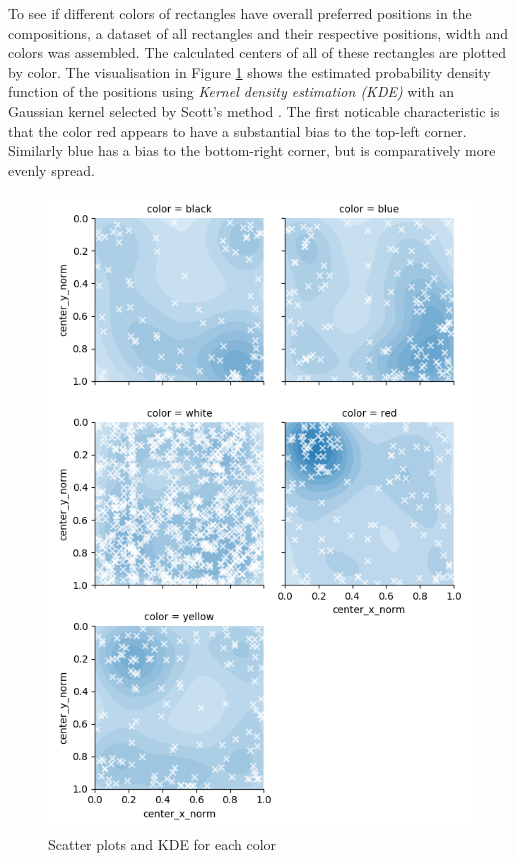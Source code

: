 \documentclass[serif,article,noparskip]{agse-thesis}
\begin{document}
To see if different colors of rectangles have overall preferred positions in the
compositions, a dataset of all rectangles and their respective positions, width
and colors was assembled. The calculated centers of all of these rectangles are
plotted by color. The visualisation in Figure \ref{fig:kde} shows the estimated
probability density function of the positions using \textit{Kernel density
estimation (KDE)} with an Gaussian kernel selected by Scott's method
\cite{Terrell1992}. The first noticable characteristic is that the color red
appears to have a substantial bias to the top-left corner. Similarly blue has a
bias to the bottom-right corner, but is comparatively more evenly spread.


\begin{figure}
\includegraphics[width=\linewidth]{images/kernel-densities.png}
\caption{Scatter plots and KDE for each color}
\label{fig:kde}
\end{figure}
\end{document}
